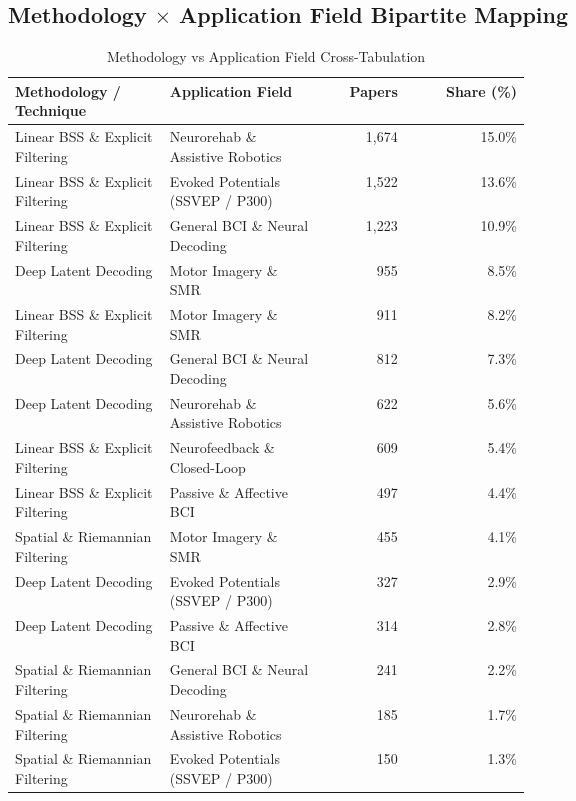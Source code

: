 \subsection{Methodology \texorpdfstring{$\times$}{x} Application Field Bipartite Mapping}
\begin{table}[htbp]
\caption{Methodology vs Application Field Cross-Tabulation}
\label{tab:method_application}
\scriptsize
\setlength{\tabcolsep}{4pt}
\begin{tabular}{p{0.30\linewidth} p{0.30\linewidth} r r}
\toprule
\textbf{Methodology / Technique} & \textbf{Application Field} & \textbf{Papers} & \textbf{Share (\%)} \\
\midrule
Linear BSS \& Explicit Filtering & Neurorehab \& Assistive Robotics & 1,674 & 15.0\% \\
Linear BSS \& Explicit Filtering & Evoked Potentials (SSVEP / P300) & 1,522 & 13.6\% \\
Linear BSS \& Explicit Filtering & General BCI \& Neural Decoding & 1,223 & 10.9\% \\
Deep Latent Decoding & Motor Imagery \& SMR & 955 & 8.5\% \\
Linear BSS \& Explicit Filtering & Motor Imagery \& SMR & 911 & 8.2\% \\
Deep Latent Decoding & General BCI \& Neural Decoding & 812 & 7.3\% \\
Deep Latent Decoding & Neurorehab \& Assistive Robotics & 622 & 5.6\% \\
Linear BSS \& Explicit Filtering & Neurofeedback \& Closed-Loop & 609 & 5.4\% \\
Linear BSS \& Explicit Filtering & Passive \& Affective BCI & 497 & 4.4\% \\
Spatial \& Riemannian Filtering & Motor Imagery \& SMR & 455 & 4.1\% \\
Deep Latent Decoding & Evoked Potentials (SSVEP / P300) & 327 & 2.9\% \\
Deep Latent Decoding & Passive \& Affective BCI & 314 & 2.8\% \\
Spatial \& Riemannian Filtering & General BCI \& Neural Decoding & 241 & 2.2\% \\
Spatial \& Riemannian Filtering & Neurorehab \& Assistive Robotics & 185 & 1.7\% \\
Spatial \& Riemannian Filtering & Evoked Potentials (SSVEP / P300) & 150 & 1.3\% \\
\bottomrule
\end{tabular}
\end{table}